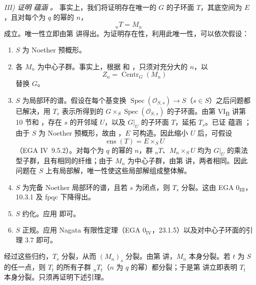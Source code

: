 \medskip
\noindent\textit{III) 证明 \textup{} 蕴涵 \textup{}。}\quad
事实上，我们将证明存在唯一的 \(G\) 的子环面 \(T\)，其底空间为 \(E\)，且对每个为 \(q\) 的幂的 \(n\)，
\[
  {}_nT=M_n
\]
成立。唯一性立即由第  讲得出。为证明存在性，利用此唯一性，可以依次假设：
\begin{enumerate}
\item[\normalfont a)] \(S\) 为 Noether 预概形。
\item[\normalfont b)] 各 \(M_n\) 为中心子群。事实上，根据  和 ，只须对充分大的 \(n\)，以
\[
  Z_n=\operatorname{Centr}_G(M_n)
\]
替换 \(G\)。
\item[\normalfont c)] \(S\) 为局部环的谱。假设在每个基变换 \(\operatorname{Spec}(\mathcal O_{S,s})\to S\)（\(s\in S\)）之后问题都已解决，用 \(T_s\) 表示所得到的 \(G\times_S\operatorname{Spec}(\mathcal O_{S,s})\) 的子环面。由第 VI\textsubscript{B} 讲第 10 节和 ，存在 \(s\) 的开邻域 \(U\)，以及 \(G|_U\) 的子环面 \(T\)，延拓 \(T_s\)。已证  蕴涵 ；由于 \(S\) 为 Noether 预概形，故由 ，\(E\) 可构造。因此缩小 \(U\) 后，可假设
\[
  \operatorname{ens}(T)=E\times_S U
\]
（EGA IV~9.5.2）。对每个为 \(q\) 的幂的 \(n\)，群 \({}_nT\)、\(M_n\times_S U\) 均为 \(G|_U\) 的乘法型子群，且有相同的纤维；由于 \(M_n\) 为中心子群，由第  讲，两者相同。因此问题在 \(S\) 上有局部解，唯一性使这些局部解组成整体解。
\item[\normalfont d)] \(S\) 为完备 Noether 局部环的谱，且若 \(s\) 为闭点，则 \(T_s\) 分裂。这由 EGA \(0_{\mathrm{III}}\)，10.3.1 及 fpqc 下降得出。
\item[\normalfont e)] \(S\) 约化。应用  即可。
\item[\normalfont f)] \(S\) 正规。应用 Nagata 有限性定理（EGA \(0_{\mathrm{IV}}\)，23.1.5）以及对中心子环面的引理 3.7 即可。
\end{enumerate}

经过这些归约，\(T_s\) 分裂，从而 \((M_n)_s\) 分裂。由第  讲，\(M_n\) 本身分裂。若 \(t\) 为 \(S\) 的任一点，则 \(T_t\) 的所有子群 \({}_nT_t\)（\(n\) 为 \(q\) 的幂）都分裂；于是第  讲立即表明 \(T_t\) 本身分裂。只须再证明下述引理。

